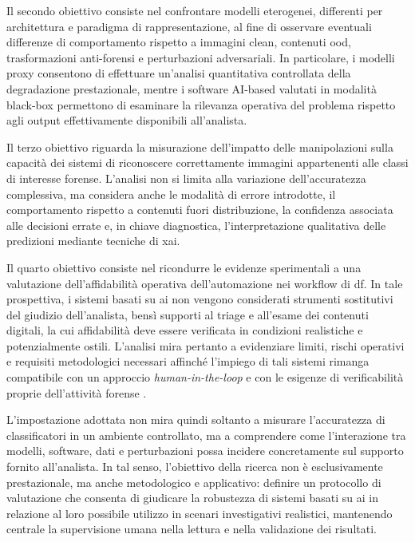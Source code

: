 Il secondo obiettivo consiste nel confrontare modelli eterogenei, differenti per architettura e paradigma di rappresentazione, al fine di osservare eventuali differenze di comportamento rispetto a immagini clean, contenuti \gls{ood}, trasformazioni anti-forensi e perturbazioni adversariali. In particolare, i modelli proxy consentono di effettuare un'analisi quantitativa controllata della degradazione prestazionale, mentre i software AI-based valutati in modalità black-box permettono di esaminare la rilevanza operativa del problema rispetto agli output effettivamente disponibili all'analista.

Il terzo obiettivo riguarda la misurazione dell'impatto delle manipolazioni sulla capacità dei sistemi di riconoscere correttamente immagini appartenenti alle classi di interesse forense. L'analisi non si limita alla variazione dell'accuratezza complessiva, ma considera anche le modalità di errore introdotte, il comportamento rispetto a contenuti fuori distribuzione, la confidenza associata alle decisioni errate e, in chiave diagnostica, l'interpretazione qualitativa delle predizioni mediante tecniche di \gls{xai}.

Il quarto obiettivo consiste nel ricondurre le evidenze sperimentali a una valutazione dell'affidabilità operativa dell'automazione nei workflow di \gls{df}. In tale prospettiva, i sistemi basati su \gls{ai} non vengono considerati strumenti sostitutivi del giudizio dell'analista, bensì supporti al triage e all'esame dei contenuti digitali, la cui affidabilità deve essere verificata in condizioni realistiche e potenzialmente ostili. L'analisi mira pertanto a evidenziare limiti, rischi operativi e requisiti metodologici necessari affinché l'impiego di tali sistemi rimanga compatibile con un approccio \textit{human-in-the-loop} e con le esigenze di verificabilità proprie dell'attività forense \cite{costantini2019digital,faqir2023digital,sanna2024preliminary}.

L'impostazione adottata non mira quindi soltanto a misurare l'accuratezza di classificatori in un ambiente controllato, ma a comprendere come l'interazione tra modelli, software, dati e perturbazioni possa incidere concretamente sul supporto fornito all'analista. In tal senso, l'obiettivo della ricerca non è esclusivamente prestazionale, ma anche metodologico e applicativo: definire un protocollo di valutazione che consenta di giudicare la robustezza di sistemi basati su \gls{ai} in relazione al loro possibile utilizzo in scenari investigativi realistici, mantenendo centrale la supervisione umana nella lettura e nella validazione dei risultati.


